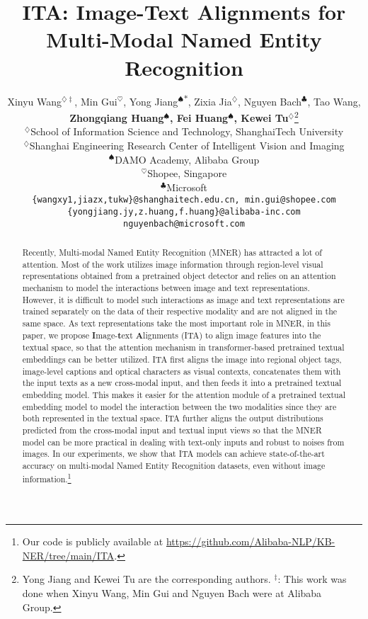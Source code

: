 \documentclass[11pt]{article}
\title{ITA: Image-Text Alignments for Multi-Modal Named Entity Recognition}
\author{Xinyu Wang$^{\diamondsuit\ddagger}$, Min Gui$^{\heartsuit}$, Yong Jiang$^{\spadesuit}$\textsuperscript{$\ast$}, Zixia Jia$^{\diamondsuit}$, Nguyen Bach$^{\clubsuit}$, Tao Wang,\\
\textbf{Zhongqiang Huang$^{\spadesuit}$, Fei Huang$^{\spadesuit}$,  Kewei Tu$^{\diamondsuit}$}\thanks{\hspace{1mm} Yong Jiang and Kewei Tu are the corresponding authors. $^{\ddagger}$: This work was done when Xinyu Wang, Min Gui and Nguyen Bach were at Alibaba Group. } \\
 $^\diamondsuit$School of Information Science and Technology, ShanghaiTech University \\
 $^\diamondsuit$Shanghai Engineering Research Center of Intelligent Vision and Imaging \\
 $^\spadesuit$DAMO Academy, Alibaba Group \\
 $^{\heartsuit}$Shopee, Singapore \\
 $^{\clubsuit}$Microsoft \\
  {\tt \{wangxy1,jiazx,tukw\}@shanghaitech.edu.cn, min.gui@shopee.com} \\
  {\tt \{yongjiang.jy,z.huang,f.huang\}@alibaba-inc.com} \\
  {\tt nguyenbach@microsoft.com} \\
}
\begin{document}
\maketitle

\begin{abstract}
Recently, Multi-modal Named Entity Recognition (MNER) has attracted a lot of attention. Most of the work utilizes image information through region-level visual representations obtained from a pretrained object detector and  relies on an attention mechanism to model the interactions between image and text representations. However, it is difficult to model such interactions as image and text representations are trained separately on the data of their respective modality and are not aligned in the same space. As text representations take the most important role in MNER, in this paper, we propose {\bf I}mage-{\bf t}ext {\bf A}lignments (ITA) to  align image features into the textual space, so that the attention mechanism in transformer-based pretrained textual embeddings can be better utilized. ITA first aligns the image into regional object tags, image-level captions and optical characters as visual contexts, concatenates them with the input texts as a new cross-modal input, and then feeds it into a pretrained textual embedding model. This makes it easier for the attention module of a pretrained textual embedding model to model the interaction between the two modalities since they are both represented in the textual space. ITA further aligns the output distributions predicted from the cross-modal input and textual input views so that the MNER model can be more practical in dealing with text-only inputs and robust to noises from images. In our experiments, we show that ITA models can achieve state-of-the-art accuracy on multi-modal Named Entity Recognition datasets, even without image information.\footnote{Our code is publicly available at \url{https://github.com/Alibaba-NLP/KB-NER/tree/main/ITA}.}




\end{abstract}
\end{document}
